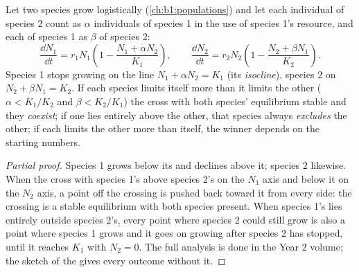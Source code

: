 \begin{proposition}\label{prop:b1:species-interactions:lotka}
Let two species grow logistically (\cref{ch:b1:populations}) and let
each individual of species 2 count as $\alpha$ individuals of species
1 in the use of species 1's resource, and each of species 1 as $\beta$
of species 2:
\[
\frac{\dd N_1}{\dd t} = r_1 N_1\left(1 - \frac{N_1 + \alpha N_2}{K_1}\right),
\qquad
\frac{\dd N_2}{\dd t} = r_2 N_2\left(1 - \frac{N_2 + \beta N_1}{K_2}\right).
\]
Species 1 stops growing on the line $N_1 + \alpha N_2 = K_1$ (its
\emph{isocline}), species 2 on $N_2 + \beta N_1 = K_2$. If
each species limits itself more than it limits the other ($\alpha <
K_1/K_2$ and $\beta < K_2/K_1$) the  cross with both species'
equilibrium stable and they \emph{coexist}; if one  lies
entirely above the other, that species always \emph{excludes} the
other; if each limits the other more than itself, the winner depends
on the starting numbers.
\end{proposition}
\begin{proof}[Partial proof]
Species 1 grows below its  and declines above it; species 2
likewise. When the  cross with species 1's above species
2's on the $N_1$ axis and below it on the $N_2$ axis, a point off the
crossing is pushed back toward it from every side: the crossing is a
stable equilibrium with both species present. When species 1's
 lies entirely outside species 2's, every point where species
2 could still grow is also a point where species 1 grows and it goes
on growing after species 2 has stopped, until it reaches $K_1$ with
$N_2 = 0$. The full analysis is done in the Year 2 volume; the sketch
of the  gives every outcome without it.
\end{proof}

